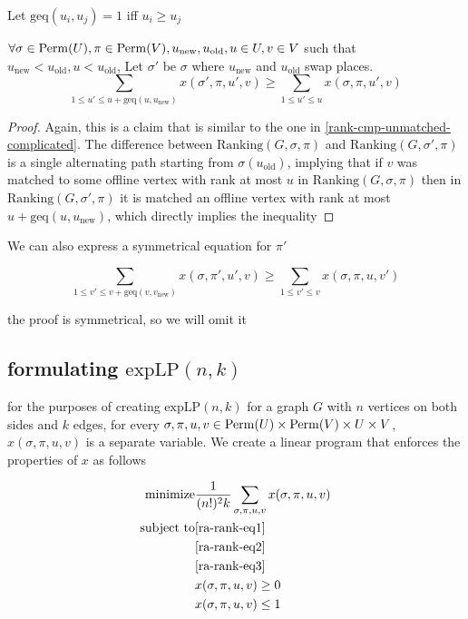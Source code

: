 Let $\mathrm{geq}(u_i,u_j)=1$ iff $u_i\geq u_j$

\begin{lemma}[Monotonicity]
	$\forall \sigma\in\mathrm{Perm}(U),\pi\in\mathrm{Perm}(V),u_{\mathrm{new}},u_{\mathrm{old}},u\in U,v\in V$ such that $u_{\mathrm{new}}<u_{\mathrm{old}},u<u_{\mathrm{old}}$,
	Let $\sigma'$ be $\sigma$ where $u_{\mathrm{new}}$ and $u_{\mathrm{old}}$ swap places.
	\begin{equation}
		\label{ra-rank-eq2}
		\sum\limits_{1\leq u'\leq u + \mathrm{geq}(u,u_{\mathrm{new}})}x(\sigma',\pi,u',v)\geq\sum\limits_{1\leq u'\leq u}x(\sigma,\pi,u',v)
	\end{equation}
\end{lemma}
\begin{proof}
	Again, this is a claim that is similar to the one in \autoref{rank-cmp-unmatched-complicated}. The difference between $\mathrm{Ranking}(G,\sigma,\pi)$ and $\mathrm{Ranking}(G,\sigma',\pi)$ is a single alternating path starting from $\sigma(u_\mathrm{old})$, implying that if $v$ was matched to some offline vertex with rank at most $u$ in $\mathrm{Ranking}(G,\sigma,\pi)$ then in $\mathrm{Ranking}(G,\sigma',\pi)$ it is matched an offline vertex with rank at most $u+\mathrm{geq}(u,u_{\mathrm{new}})$, which directly implies the inequality
\end{proof}

We can also express a symmetrical equation for $\pi'$

\begin{equation}
	\label{ra-rank-eq3}
	\sum\limits_{1\leq v'\leq v + \mathrm{geq}(v,v_{\mathrm{new}})}x(\sigma,\pi',u',v)\geq\sum\limits_{1\leq v'\leq v}x(\sigma,\pi,u,v')
\end{equation}

the proof is symmetrical, so we will omit it

\subsection[formulating expLP(n,k)]{formulating $\mathrm{expLP}(n,k)$}

for the purposes of creating $\mathrm{expLP}(n,k)$ for a graph $G$ with $n$ vertices on both sides and $k$ edges, for every $\sigma,\pi,u,v\in\mathrm{Perm}(U)\times\mathrm{Perm}(V)\times U\times V$, $x(\sigma,\pi,u,v)$ is a separate variable. We create a linear program that enforces the properties of $x$ as follows

\begin{align*}
	\text{minimize} & \frac{1}{(n!)^2k}\sum\limits_{\sigma,\pi,u,v}x(\sigma,\pi,u,v)\\
	\text{subject to} & \autoref{ra-rank-eq1}\\
	& \autoref{ra-rank-eq2}\\
	& \autoref{ra-rank-eq3}\\
	& x(\sigma,\pi,u,v)\geq 0\\
	& x(\sigma,\pi,u,v)\leq 1
\end{align*}


